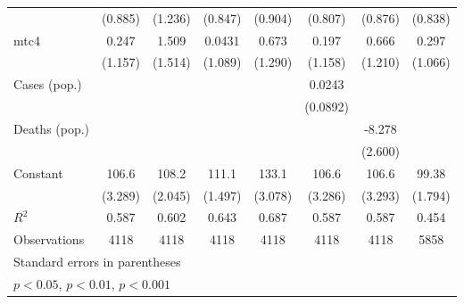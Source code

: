 \documentclass{article}
\begin{document}
{\begin{longtable}{l*{7}{c}}
                &  (0.885)         &  (1.236)         &  (0.847)         &  (0.904)         &  (0.807)         &  (0.876)         &  (0.838)         \\
mtc4            &    0.247         &    1.509         &   0.0431         &    0.673         &    0.197         &    0.666         &    0.297         \\
                &  (1.157)         &  (1.514)         &  (1.089)         &  (1.290)         &  (1.158)         &  (1.210)         &  (1.066)         \\
Cases (pop.)    &                  &                  &                  &                  &   0.0243         &                  &                  \\
                &                  &                  &                  &                  & (0.0892)         &                  &                  \\
Deaths (pop.)   &                  &                  &                  &                  &                  &   -8.278\sym{**} &                  \\
                &                  &                  &                  &                  &                  &  (2.600)         &                  \\
Constant        &    106.6\sym{***}&    108.2\sym{***}&    111.1\sym{***}&    133.1\sym{***}&    106.6\sym{***}&    106.6\sym{***}&    99.38\sym{***}\\
                &  (3.289)         &  (2.045)         &  (1.497)         &  (3.078)         &  (3.286)         &  (3.293)         &  (1.794)         \\
\hline
\(R^{2}\)       &    0.587         &    0.602         &    0.643         &    0.687         &    0.587         &    0.587         &    0.454         \\
Observations    &     4118         &     4118         &     4118         &     4118         &     4118         &     4118         &     5858         \\
\hline\hline
\multicolumn{8}{l}{\footnotesize Standard errors in parentheses}\\
\multicolumn{8}{l}{\footnotesize \sym{*} \(p<0.05\), \sym{**} \(p<0.01\), \sym{***} \(p<0.001\)}\\
\end{longtable}
}
\end{document}
